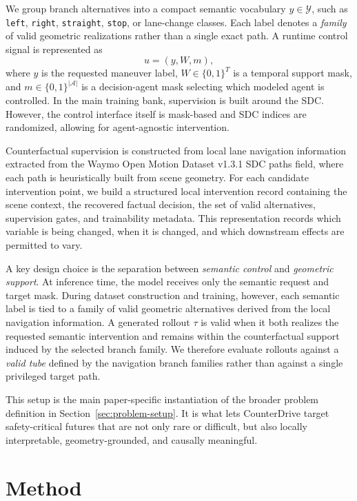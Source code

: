 \documentclass{article}
\begin{document}
We group branch alternatives into a compact semantic vocabulary $y \in \mathcal{Y}$, such as \texttt{left}, \texttt{right}, \texttt{straight}, \texttt{stop}, or lane-change classes. Each label denotes a \emph{family} of valid geometric realizations rather than a single exact path. A runtime control signal is represented as
\[
u=(y, W, m),
\]
where $y$ is the requested maneuver label, $W \in \{0,1\}^{T}$ is a temporal support mask, and $m \in \{0,1\}^{|\mathcal{A}|}$ is a decision-agent mask selecting which modeled agent is controlled. In the main training bank, supervision is built around the SDC. However, the control interface itself is mask-based and SDC indices are randomized, allowing for agent-agnostic intervention.

Counterfactual supervision is constructed from local lane navigation information extracted from the Waymo Open Motion Dataset v1.3.1 SDC paths field, where each path is heuristically built from scene geometry. For each candidate intervention point, we build a structured local intervention record containing the scene context, the recovered factual decision, the set of valid alternatives, supervision gates, and trainability metadata. This representation records which variable is being changed, when it is changed, and which downstream effects are permitted to vary.

A key design choice is the separation between \emph{semantic control} and \emph{geometric support}. At inference time, the model receives only the semantic request and target mask. During dataset construction and training, however, each semantic label is tied to a family of valid geometric alternatives derived from the local navigation information. A generated rollout $\tau$ is valid when it both realizes the requested semantic intervention and remains within the counterfactual support induced by the selected branch family. We therefore evaluate rollouts against a \emph{valid tube} defined by the navigation branch families rather than against a single privileged target path.

This setup is the main paper-specific instantiation of the broader problem definition in Section~\ref{sec:problem-setup}. It is what lets CounterDrive target safety-critical futures that are not only rare or difficult, but also locally interpretable, geometry-grounded, and causally meaningful.

\section{Method}
\label{sec:method}
\end{document}
